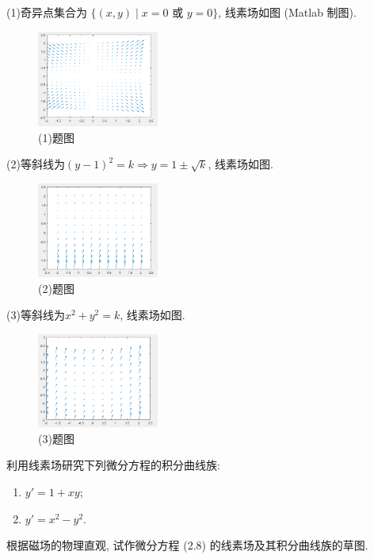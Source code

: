 \begin{solve}
  (1)奇异点集合为 $\{(x,y)\mid x=0\text{\ 或\ }y=0\}$, 线素场如图 (Matlab 制图).
  \begin{figure}[htb]
  \centering
  \includegraphics[width=4cm]{figure/ODE1_2_1.png}
  \caption{(1)题图}
  \end{figure}

  (2)等斜线为$(y-1)^2=k\Rightarrow y=1\pm\sqrt{k}$, 线素场如图.
  \begin{figure}[htb]
  \centering
  \includegraphics[width=4cm]{figure/ODE1_2_2.png}
  \caption{(2)题图}
  \end{figure}

  (3)等斜线为$x^2+y^2=k$, 线素场如图.
  \begin{figure}[htb]
  \centering
  \includegraphics[width=4cm]{figure/ODE1_2_3.png}
  \caption{(3)题图}
  \end{figure}
\end{solve}



\begin{exercise}
  利用线素场研究下列微分方程的积分曲线族:
  \begin{enumerate}[(1)]
    \item $y' = 1+xy$;
    \item $y' = x^2-y^2$.
  \end{enumerate}
\end{exercise}



\begin{exercise}
  根据磁场的物理直观, 试作微分方程 (2.8) 的线素场及其积分曲线族的草图.
\end{exercise}
